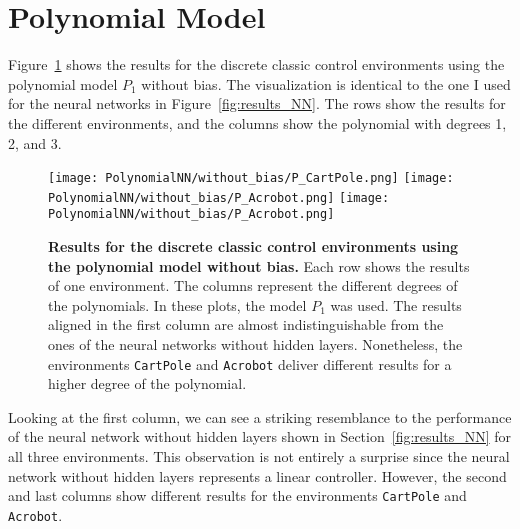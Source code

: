 \section{Polynomial Model}
Figure~\ref{fig:results_Polynomial} shows the results for the discrete classic control environments using the polynomial model $P_1$ without bias. The visualization is identical to the one I used for the neural networks in Figure~\ref{fig:results_NN}. The rows show the results for the different environments, and the columns show the polynomial with degrees 1, 2, and 3.
\begin{figure}[!ht]
  \centering
  \texttt{[image: PolynomialNN/without\_bias/P\_CartPole.png]}
  \texttt{[image: PolynomialNN/without\_bias/P\_Acrobot.png]}
  \texttt{[image: PolynomialNN/without\_bias/P\_Acrobot.png]}
\caption[Results for the discrete classic control environments using the polynomial model without bias]{
  \textbf{Results for the discrete classic control environments using the polynomial model without bias.}
   Each row shows the results of one environment. The columns represent the different degrees of the polynomials. In these plots, the model $P_1$ was used. The results aligned in the first column are almost indistinguishable from the ones of the neural networks without hidden layers. Nonetheless, the environments \texttt{CartPole} and \texttt{Acrobot} deliver different results for a higher degree of the polynomial.
}
\label{fig:results_Polynomial}
\end{figure}
Looking at the first column, we can see a striking resemblance to the performance of the neural network without hidden layers shown in Section~\ref{fig:results_NN} for all three environments. This observation is not entirely a surprise since the neural network without hidden layers represents a linear controller. However, the second and last columns show different results for the environments \verb|CartPole| and \verb|Acrobot|.


